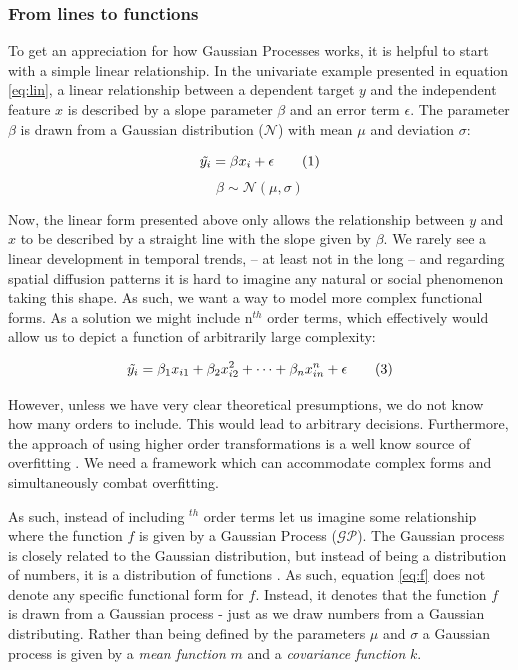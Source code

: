 \documentclass[a4paper]{article}
\begin{document}
\subsubsection{From lines to functions}

To get an appreciation for how Gaussian Processes works, it is helpful to start with a simple linear relationship. In the univariate example presented in equation \ref{eq:lin}, a linear relationship between a dependent target $y$ and the independent feature $x$ is described by a slope parameter $\beta$ and an error term $\epsilon$. The parameter $\beta$ is drawn from a Gaussian distribution ($\mathcal{N}$) with mean $\mu$ and deviation $\sigma$:

\[
\Tilde{y_i} = \beta x_i + \epsilon  \tag{1} \label{eq:lin}
\]
\[
\beta \sim \mathcal{N}(\mu,\sigma)  \tag{2} \label{eq:beta}
\]

Now, the linear form presented above only allows the relationship between $y$ and $x$ to be described by a straight line with the slope given by $\beta$. We rarely see a linear development in temporal trends, -- at least not in the long -- and regarding spatial diffusion patterns it is hard to imagine any natural or social phenomenon taking this shape. As such, we want a way to model more complex functional forms. As a solution we might include n$^{th}$ order terms, which effectively would allow us to depict a function of arbitrarily large complexity:\par

\[
\Tilde{y_i} = \beta_1 x_{i1} + \beta_2 x_{i2}^2 + \dots + \beta_n x_{in}^n + \epsilon  \tag{3} \label{eq:orders}
\]

However, unless we have very clear theoretical presumptions, we do not know how many orders to include. This would lead to arbitrary decisions. Furthermore, the approach of using higher order transformations is a well know source of overfitting \citep[2]{williams2006gaussian}. We need a framework which can accommodate complex forms and simultaneously combat overfitting.\par

As such, instead of including $^{th}$ order terms let us imagine some relationship where the function $f$ is given by a Gaussian Process ($\mathcal{GP}$). The Gaussian process is closely related to the Gaussian distribution, but instead of being a distribution of numbers, it is a distribution of functions \citep[13-15]{williams2006gaussian}. As such, equation \ref{eq:f} does not denote any specific functional form for $f$. Instead, it denotes that the function $f$ is drawn from a Gaussian process - just as we draw numbers from a Gaussian distributing. Rather than being defined by the parameters $\mu$ and $\sigma$ a Gaussian process is given by a \emph{mean function} $m$ and a \emph{covariance function} $k$.\par
\end{document}
